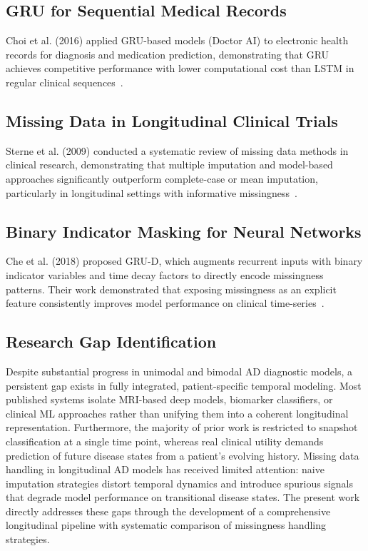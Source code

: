 \documentclass[12pt,singleside,a4paper]{article}
\begin{document}
\subsection{GRU for Sequential Medical Records}
Choi et al. (2016) applied GRU-based models (Doctor AI) to electronic health records for diagnosis and medication prediction, demonstrating that GRU achieves competitive performance with lower computational cost than LSTM in regular clinical sequences~\cite{choi2016}.

\subsection{Missing Data in Longitudinal Clinical Trials}
Sterne et al. (2009) conducted a systematic review of missing data methods in clinical research, demonstrating that multiple imputation and model-based approaches significantly outperform complete-case or mean imputation, particularly in longitudinal settings with informative missingness~\cite{sterne2009}.

\subsection{Binary Indicator Masking for Neural Networks}
Che et al. (2018) proposed GRU-D, which augments recurrent inputs with binary indicator variables and time decay factors to directly encode missingness patterns. Their work demonstrated that exposing missingness as an explicit feature consistently improves model performance on clinical time-series~\cite{che2018}.

\subsection{Research Gap Identification}

Despite substantial progress in unimodal and bimodal AD diagnostic models, a persistent gap exists in fully integrated, patient-specific temporal modeling. Most published systems isolate MRI-based deep models, biomarker classifiers, or clinical ML approaches rather than unifying them into a coherent longitudinal representation. Furthermore, the majority of prior work is restricted to snapshot classification at a single time point, whereas real clinical utility demands prediction of future disease states from a patient's evolving history. Missing data handling in longitudinal AD models has received limited attention: naive imputation strategies distort temporal dynamics and introduce spurious signals that degrade model performance on transitional disease states. The present work directly addresses these gaps through the development of a comprehensive longitudinal pipeline with systematic comparison of missingness handling strategies.
\end{document}
